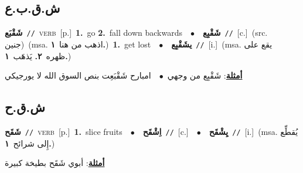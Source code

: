 \documentclass[10pt,a4paper,twoside]{article} %
\begin{document}
\begin{multicols}{2}
\vspace{-3mm}
\subsection*{\color{blue}\foreignlanguage{arabic}{ش.ق.ب.ع}\color{blue}{}} 

{\setlength\topsep{0pt}\textbf{\foreignlanguage{arabic}{شَقْبَع}}\ {\color{gray}\texttt{//}\color{black}}\ \textsc{verb}\ [p.]\ \textbf{1.}~go  \textbf{2.}~fall down backwards\ \ $\bullet$\ \ \setlength\topsep{0pt}\textbf{\foreignlanguage{arabic}{شَقْبِع}}\ {\color{gray}\texttt{//}\color{black}}\ [c.]\ (src. \color{gray}\foreignlanguage{arabic}{جنين}\color{black})\ \color{gray}(msa. \foreignlanguage{arabic}{اذهب من هنا}~\foreignlanguage{arabic}{\textbf{١.}})\color{black}\ \textbf{1.}~get lost\ \ $\bullet$\ \ \setlength\topsep{0pt}\textbf{\foreignlanguage{arabic}{يشَقْبِع}}\ {\color{gray}\texttt{//}\color{black}}\ [i.]\ \color{gray}(msa. \foreignlanguage{arabic}{يقع على ظهره}~\foreignlanguage{arabic}{\textbf{٢.}}  \foreignlanguage{arabic}{يَذهَب}~\foreignlanguage{arabic}{\textbf{١.}})\color{black}\  \begin{flushright}\color{gray}\foreignlanguage{arabic}{\textbf{\underline{\foreignlanguage{arabic}{أمثلة}}}: شَقْبِع من وجهي\ $\bullet$\ \  امبارح شَقْبَعِت بنص السوق الله لا يورجيكي}\end{flushright}\color{black}} \vspace{2mm}

\vspace{-3mm}
\subsection*{\color{blue}\foreignlanguage{arabic}{ش.ق.ح}\color{blue}{}} 

{\setlength\topsep{0pt}\textbf{\foreignlanguage{arabic}{شَقَح}}\ {\color{gray}\texttt{//}\color{black}}\ \textsc{verb}\ [p.]\ \textbf{1.}~slice fruits\ \ $\bullet$\ \ \setlength\topsep{0pt}\textbf{\foreignlanguage{arabic}{اِشْقَح}}\ {\color{gray}\texttt{//}\color{black}}\ [c.]\ \ $\bullet$\ \ \setlength\topsep{0pt}\textbf{\foreignlanguage{arabic}{يِشْقَح}}\ {\color{gray}\texttt{//}\color{black}}\ [i.]\ \color{gray}(msa. \foreignlanguage{arabic}{يُقطِّع إِلى شرائح}~\foreignlanguage{arabic}{\textbf{١.}})\color{black}\  \begin{flushright}\color{gray}\foreignlanguage{arabic}{\textbf{\underline{\foreignlanguage{arabic}{أمثلة}}}: أبوي شَقَح بطيخة كبيرة}\end{flushright}\color{black}} \vspace{2mm}


\end{multicols}
\end{document}
